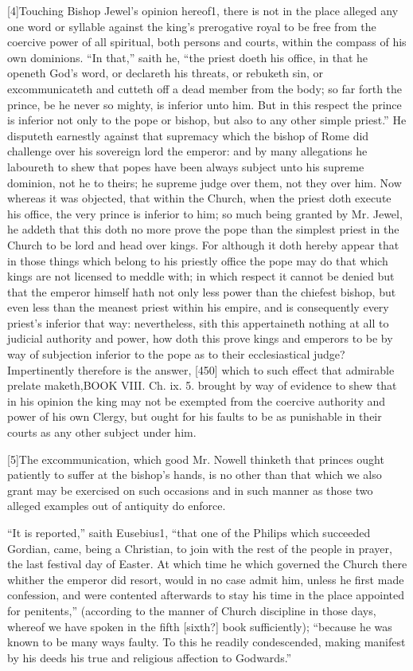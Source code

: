 [4]Touching Bishop Jewel’s opinion hereof1, there is not in the place alleged any one word or syllable against the king’s prerogative royal to be free from the coercive power of all spiritual, both persons and courts, within the compass of his own dominions. “In that,” saith he, “the priest doeth his office, in that he openeth God’s word, or declareth his threats, or rebuketh sin, or excommunicateth and cutteth off a dead member from the body; so far forth the prince, be he never so mighty, is inferior unto him. But in this respect the prince is inferior not only to the pope or bishop, but also to any other simple priest.” He disputeth earnestly against that supremacy which the bishop of Rome did challenge over his sovereign lord the emperor: and by many allegations he laboureth to shew that popes have been always subject unto his supreme dominion, not he to theirs; he supreme judge over them, not they over him. Now whereas it was objected, that within the Church, when the priest doth execute his office, the very prince is inferior to him; so much being granted by Mr. Jewel, he addeth that this doth no more prove the pope than the simplest priest in the Church to be lord and head over kings. For although it doth hereby appear that in those things which belong to his priestly office the pope may do that which kings are not licensed to meddle with; in which respect it cannot be denied but that the emperor himself hath not only less power than the chiefest bishop, but even less than the meanest priest within his empire, and is consequently every priest’s inferior that way: nevertheless, sith this appertaineth nothing at all to judicial authority and power, how doth this prove kings and emperors to be by way of subjection inferior to the pope as to their ecclesiastical judge? Impertinently therefore is the answer, [450] which to such effect that admirable prelate maketh,BOOK VIII. Ch. ix. 5. brought by way of evidence to shew that in his opinion the king may not be exempted from the coercive authority and power of his own Clergy, but ought for his faults to be as punishable in their courts as any other subject under him.

[5]The excommunication, which good Mr. Nowell thinketh that princes ought patiently to suffer at the bishop’s hands, is no other than that which we also grant may be exercised on such occasions and in such manner as those two alleged examples out of antiquity do enforce.

“It is reported,” saith Eusebius1, “that one of the Philips which succeeded Gordian, came, being a Christian, to join with the rest of the people in prayer, the last festival day of Easter. At which time he which governed the Church there whither the emperor did resort, would in no case admit him, unless he first made confession, and were contented afterwards to stay his time in the place appointed for penitents,” (according to the manner of Church discipline in those days, whereof we have spoken in the fifth [sixth?] book sufficiently); “because he was known to be many ways faulty. To this he readily condescended, making manifest by his deeds his true and religious affection to Godwards.”

